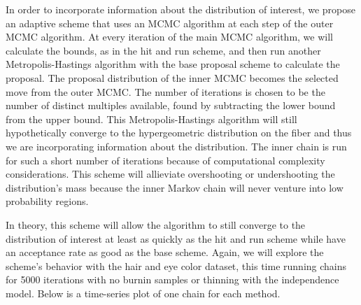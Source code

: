 \documentclass{phd}\usepackage[]{graphicx}\usepackage[]{color}
\makeatletter
\newenvironment{kframe}{%
 \def\at@end@of@kframe{}%
 \ifinner\ifhmode%
  \def\at@end@of@kframe{\end{minipage}}%
  \begin{minipage}{\columnwidth}%
 \fi\fi%
 \def\FrameCommand##1{\hskip\@totalleftmargin \hskip-\fboxsep
 \colorbox{shadecolor}{##1}\hskip-\fboxsep
     \hskip-\linewidth \hskip-\@totalleftmargin \hskip\columnwidth}%
 \MakeFramed {\advance\hsize-\width
   \@totalleftmargin\z@ \linewidth\hsize
   \@setminipage}}%
 {\par\unskip\endMakeFramed%
 \at@end@of@kframe}
\newenvironment{knitrout}{}{} %
\makeatother
\begin{document}
In order to incorporate information about the distribution of interest, we propose an adaptive scheme that uses an MCMC algorithm at each step of the outer MCMC algorithm. At every iteration of the main MCMC algorithm, we will calculate the bounds, as in the hit and run scheme, and then run another Metropolis-Hastings algorithm with the base proposal scheme to calculate the proposal. The proposal distribution of the inner MCMC becomes the selected move from the outer MCMC. The number of iterations is chosen to be the number of distinct multiples available, found by subtracting the lower bound from the upper bound. This Metropolis-Hastings algorithm will still hypothetically converge to the hypergeometric distribution on the fiber and thus we are incorporating information about the distribution. The inner chain is run for such a short number of iterations because of computational complexity considerations. This scheme will allieviate overshooting or undershooting the distribution's mass because the inner Markov chain will never venture into low probability regions. 

In theory, this scheme will allow the algorithm to still converge to the distribution of interest at least as quickly as the hit and run scheme while have an acceptance rate as good as the base scheme. Again, we will explore the scheme's behavior with the hair and eye color dataset, this time running chains for 5000 iterations with no burnin samples or thinning with the independence model. Below is a time-series plot of one chain for each method.

\begin{knitrout}
\color{fgcolor}\begin{kframe}


{\ttfamily\noindent\bfseries\color{errorcolor}{\#\# Error in metropolis(tbl, moves, suff\_stats, A, hitAndRun = T, adaptive = T): unused argument (hitAndRun = T)}}

{\ttfamily\noindent\bfseries\color{errorcolor}{\#\# Error in eval(lhs, parent, parent): object 'adapt' not found}}

{\ttfamily\noindent\bfseries\color{errorcolor}{\#\# Error in eval\_tidy(xs[[i]], unique\_output): object 'base\_steps' not found}}

{\ttfamily\noindent\bfseries\color{errorcolor}{\#\# Error in eval(lhs, parent, parent): object 'plot\_adapt' not found}}\end{kframe}
\end{knitrout}
\end{document}
